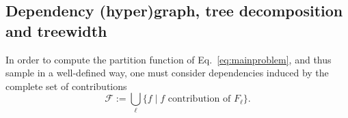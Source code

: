 \documentclass[]{bmcart}
\newcommand{\dep}{\operatorname{dep}}
\newcommand{\B}{\mathcal{B}}
\newcommand{\F}{\mathcal{F}}
\newcommand{\R}{\mathcal{R}}
\newcommand{\Def}[1]{\emph{#1}}
\newcommand{\Nuc}[1]{{\sf #1}}
\newcommand{\Ab}{\Nuc{A}}
\newcommand{\Cb}{\Nuc{C}}
\newcommand{\Gb}{\Nuc{G}}
\newcommand{\Ub}{\Nuc{U}}
\newcommand{\revised}[1]{{\color{red} #1}}
\begin{document}
\subsection*{Dependency (hyper)graph, tree decomposition and treewidth}




\revised{In order to compute the partition function of Eq.~\ref{eq:mainproblem}, and thus sample in a well-defined way, one must consider dependencies induced by the complete set of contributions $$\F := \bigcup_{\ell}\{f\mid f\text{ contribution of } F_\ell\}.$$}

%
%
\end{document}
